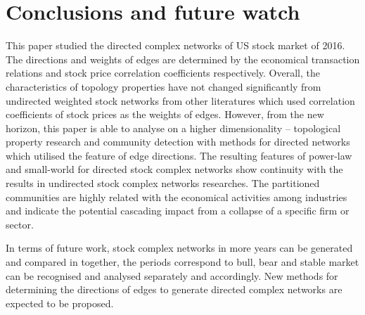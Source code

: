 \chapter[Conclusions]{Conclusions and future watch}
This paper studied the directed complex networks of US stock market of 2016. The directions and weights of edges are determined by the economical transaction relations and stock price correlation coefficients respectively. Overall, the characteristics of topology properties have not changed significantly from undirected weighted stock networks from other literatures which used correlation coefficients of stock prices as the weights of edges. However, from the new horizon, this paper is able to analyse on a higher dimensionality -- topological property research and community detection with methods for directed networks which utilised the feature of edge directions. The resulting features of power-law and small-world for directed stock complex networks show continuity with the results in undirected stock complex networks researches. The partitioned communities are highly related with the economical activities among industries and indicate the potential cascading impact from a collapse of a specific firm or sector.

In terms of future work, stock complex networks in more years can be generated and compared in together, the periods correspond to bull, bear and stable market can be recognised and analysed separately and accordingly. New methods for determining the directions of edges to generate directed complex networks are expected to be proposed.
